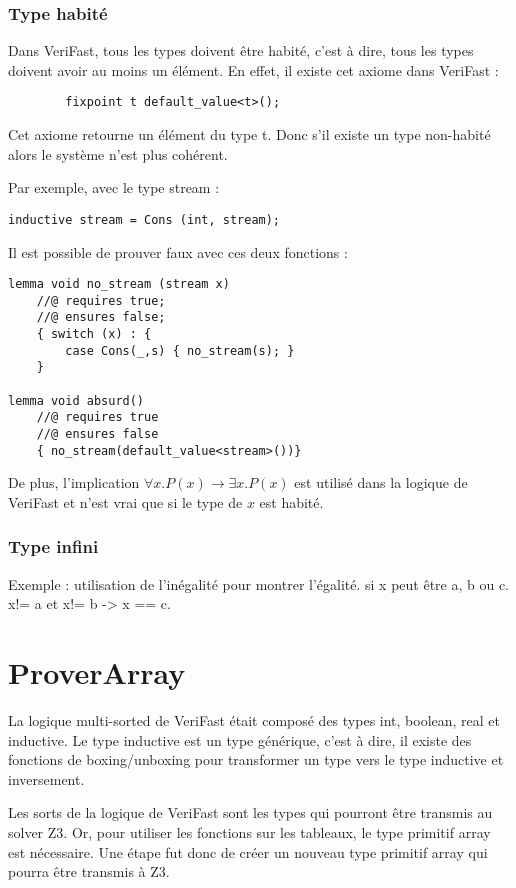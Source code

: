 \documentclass[9pt]{book}
\newcommand{\verifast}{VeriFast}
\begin{document}
			\subsubsection{Type habit\'e}
				Dans \verifast{}, tous les types doivent \^etre habit\'e, c'est \`a dire, tous les types doivent avoir au moins un \'el\'ement. En effet, il existe cet axiome dans \verifast{} :
		\begin{lstlisting}
		fixpoint t default_value<t>();
		\end{lstlisting}
		Cet axiome retourne un \'el\'ement du type t. Donc s'il existe un type non-habit\'e alors le syst\`eme n'est plus coh\'erent. \par
		Par exemple, avec le type stream :
\begin{lstlisting}
inductive stream = Cons (int, stream);
\end{lstlisting}
Il est possible de prouver faux avec ces deux fonctions :
\begin{lstlisting}
lemma void no_stream (stream x)
	//@ requires true;
	//@ ensures false;
	{ switch (x) : {
		case Cons(_,s) { no_stream(s); }
	}

lemma void absurd()
	//@ requires true
	//@ ensures false
	{ no_stream(default_value<stream>())}

		\end{lstlisting}
\par De plus, l'implication
				$\forall x. P(x) \rightarrow \exists x. P(x)$ est utilis\'e dans la logique de \verifast{} et n'est vrai que si le type de $x$ est habit\'e.
			\subsubsection{Type infini}
				Exemple : utilisation de l'in\'egalit\'e pour montrer l'\'egalit\'e. si x peut \^etre a, b ou c. x!= a et x!= b -> x == c.

	\section{ProverArray}
		La logique multi-sorted de \verifast{} \'etait compos\'e des types int, boolean, real et inductive. Le type inductive est un type g\'en\'erique, c'est \`a dire, il existe des fonctions de boxing/unboxing pour transformer un type vers le type inductive et inversement. \par
		Les sorts de la logique de \verifast{} sont les types qui pourront \^etre transmis au solver Z3. Or, pour utiliser les fonctions sur les tableaux, le type primitif array est n\'ecessaire. Une \'etape fut donc de cr\'eer un nouveau type primitif array qui pourra \^etre transmis \`a Z3.\par
\end{document}
